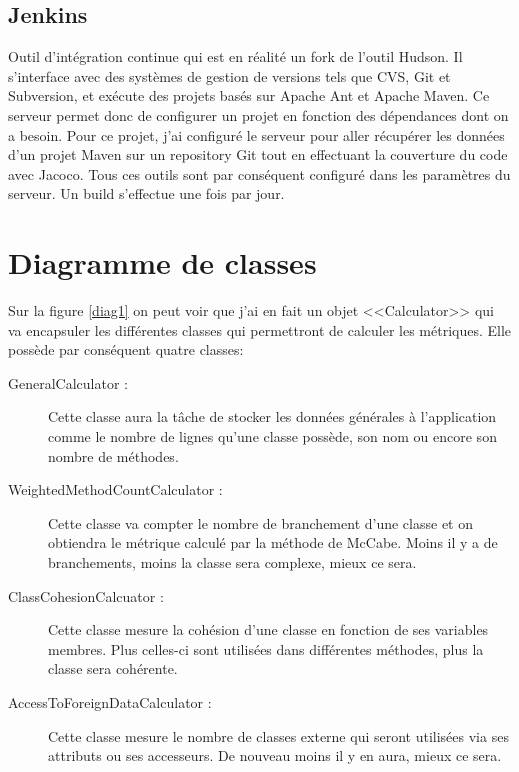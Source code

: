 \documentclass[a4paper, 11pt]{article}
\begin{document}
	\subsection{Jenkins}
		Outil d'intégration continue qui est en réalité un fork de l'outil Hudson. Il s'interface avec des systèmes de gestion de versions tels que CVS, Git et Subversion, et exécute des projets basés sur Apache Ant et Apache Maven. Ce serveur permet donc de configurer un projet en fonction des dépendances dont on a besoin. Pour ce projet, j'ai configuré le serveur pour aller récupérer les données d'un projet Maven sur un repository Git tout en effectuant la couverture du code avec Jacoco. Tous ces outils sont par conséquent configuré dans les paramètres du serveur. Un build s'effectue une fois par jour.
	
\section{Diagramme de classes}
	Sur la figure \ref{diag1} on peut voir que j'ai en fait un objet <<Calculator>> qui va encapsuler les différentes classes qui permettront de calculer les métriques. Elle possède par conséquent quatre classes:
	\begin{description}
		\item[GeneralCalculator :] Cette classe aura la tâche de stocker les données générales à l'application comme le nombre de lignes qu'une classe possède, son nom ou encore son nombre de méthodes.
		\item[WeightedMethodCountCalculator :] Cette classe va compter le nombre de branchement d'une classe et on obtiendra le métrique calculé par la méthode de McCabe. Moins il y a de branchements, moins la classe sera complexe, mieux ce sera.
		\item[ClassCohesionCalcuator :] Cette classe mesure la cohésion d'une classe en fonction de ses variables membres. Plus celles-ci sont utilisées dans différentes méthodes, plus la classe sera cohérente.
		\item[AccessToForeignDataCalculator :] Cette classe mesure le nombre de classes externe qui seront utilisées via ses attributs ou ses accesseurs. De nouveau moins il y en aura, mieux ce sera.
	\end{description}
	
\end{document}
